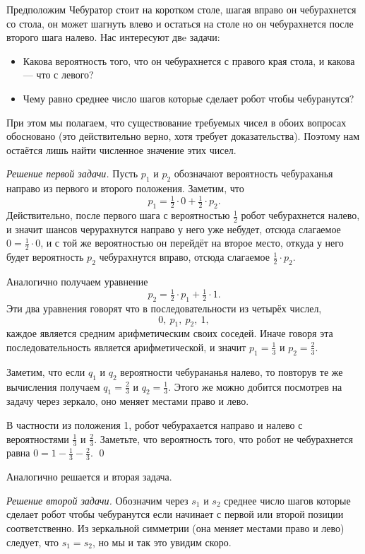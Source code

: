 \documentclass{article}
\begin{document}
Предположим Чебуратор стоит на коротком столе,
шагая вправо он чебурахнется со стола,
он может шагнуть влево и остаться на столе но он чебурахнется после второго шага налево.
Нас интересуют двe задачи:
\begin{itemize}
\item Какова вероятность того, что он чебурахнется с правого края стола, и какова --- что с левого?
\item Чему равно среднее число шагов которые сделает робот чтобы чебуранутся?
\end{itemize}
При этом мы полагаем, что существование требуемых чисел в обоих вопросах обосновано
(это действительно верно, хотя требует доказательства).
Поэтому нам остаётся лишь найти
численное значение этих чисел. 

\medskip
\noindent\textit{Решение первой задачи.}
Пусть $p_1$ и $p_2$ обозначают вероятность чебураханья направо из первого и второго положения. 
Заметим, что
\[p_1=\tfrac12\cdot0+\tfrac12\cdot p_2.\]
Действительно, после первого шага 
с вероятностью $\tfrac12$ робот чебурахнется налево,
и значит шансов черурахнутся направо у него уже небудет, 
отсюда слагаемое $0=\tfrac12\cdot0$,
и с той же вероятностью он перейдёт на второе место,
откуда у него будет вероятность $p_2$ чебурахнутся вправо,
отсюда слагаемое $\tfrac12\cdot p_2$.

Аналогично получаем уравнение 
\[p_2=\tfrac12\cdot p_1+\tfrac12\cdot 1.\]
Эти два уравнения говорят что в последовательности из четырёх числел, 
\[0,\  p_1,\  p_2,\ 1,\]
каждое является средним арифметическим своих соседей.
Иначе говоря эта последовательность является арифметической, 
и значит $p_1=\tfrac13$ и $p_2=\tfrac23$.

Заметим, что если $q_1$ и $q_2$ вероятности чебурананья налево, 
то повторув те же вычисления получаем $q_1=\tfrac23$ и $q_2=\tfrac13$.
Этого же можно добится посмотрев на задачу через зеркало, оно меняет местами право и лево.

В частности из положения 1, робот чебурахается направо и налево с вероятностями $\tfrac13$ и $\tfrac23$.
Заметьте, что вероятность того, что 
робот не чебурахнется равна $0=1-\tfrac13-\tfrac23$.
\qed
\medskip

Аналогично решается и вторая задача.

\medskip
\noindent\textit{Решение второй задачи.}
Обозначим через $s_1$ и $s_2$ среднее число шагов которые сделает робот чтобы чебуранутся
если начинает с первой или второй позиции соответственно.
Из зеркальной симметрии (она меняет местами право и лево) следует, что $s_1=s_2$,
но мы и так это увидим скоро.
\end{document}
